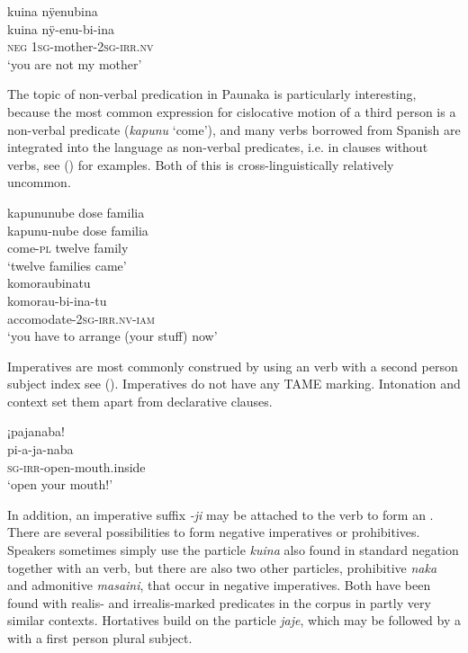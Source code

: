 \ea\label{ex:Sketch-NVPRED}
\begingl
\glpreamble kuina nÿenubina\\
\gla kuina nÿ-enu-bi-ina\\
\glb \textsc{neg} 1\textsc{sg}-mother-2\textsc{sg}-\textsc{irr.nv}\\
\glft ‘you are not my mother’\\
\endgl
\xe

The topic of non-verbal predication in Paunaka is particularly interesting, because the most common expression for cislocative motion of a third person is a non-verbal predicate (\textit{kapunu} ‘come’), and many verbs borrowed from Spanish are integrated into the language as non-verbal predicates, i.e. in clauses without verbs, see () for examples. Both of this is cross-linguistically relatively uncommon.

\ea\label{ex:Sketch-NVPRED2}
  \ea
\begingl
\glpreamble kapununube dose familia\\
\gla kapunu-nube dose familia\\
\glb come-\textsc{pl} twelve family\\
\glft ‘twelve families came’\\
\endgl
  \ex
\begingl
\glpreamble komoraubinatu\\
\gla komorau-bi-ina-tu\\
\glb accomodate-2\textsc{sg}-\textsc{irr.nv}-\textsc{iam}\\
\glft ‘you have to arrange (your stuff) now’\\
\endgl
\z
\xe
{}

Imperatives are most commonly construed by using an  verb with a second person subject index see (). Imperatives do not have any TAME marking. Intonation and context set them apart from declarative clauses.

\ea\label{ex:Sketch-IMP}
\begingl
\glpreamble ¡pajanaba!\\
\gla pi-a-ja-naba\\
\textsc{sg}-\textsc{irr}-open-mouth.inside\\
\glft ‘open your mouth!’\\
\endgl
\xe

In addition, an imperative suffix \textit{-ji} may be attached to the verb to form an . There are several possibilities to form negative imperatives or prohibitives. Speakers sometimes simply use the particle \textit{kuina} also found in standard negation together with an  verb, but there are also two other particles, prohibitive \textit{naka} and admonitive \textit{masaini}, that occur in negative imperatives. Both have been found with realis- and irrealis-marked predicates in the corpus in partly very similar contexts. Hortatives build on the particle \textit{jaje}, which may be followed by a  with a first person plural subject.

